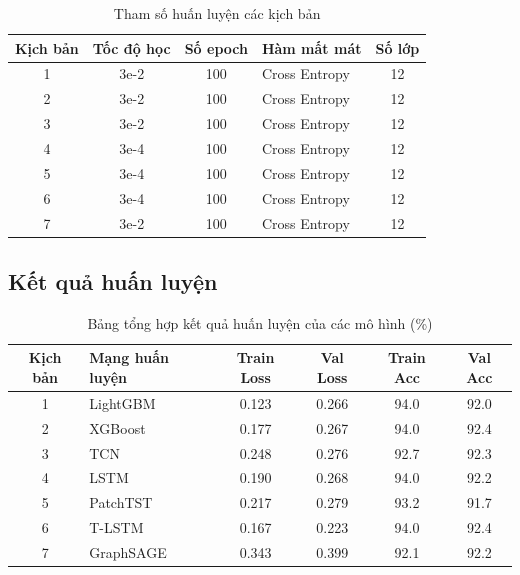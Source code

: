 \documentclass[10pt,twoside]{article}
\begin{document}
\begin{table}[H] 
\centering 
\caption{Tham số huấn luyện các kịch bản} 
\label{tab:hyperparameter} 
\begin{tabular}{c c c l c} 
\hline 
\textbf{Kịch bản} & \textbf{Tốc độ học} & \textbf{Số epoch} & \textbf{Hàm mất mát} & \textbf{Số lớp} \\ 
\hline 
1 & 3e-2 & 100 & Cross Entropy & 12 \\ 
2 & 3e-2 & 100 & Cross Entropy & 12 \\ 
3 & 3e-2 & 100 & Cross Entropy & 12 \\ 
4 & 3e-4 & 100 & Cross Entropy & 12 \\ 
5 & 3e-4 & 100 & Cross Entropy & 12 \\ 
6 & 3e-4 & 100 & Cross Entropy & 12 \\ 
7 & 3e-2 & 100 & Cross Entropy & 12 \\ 
\hline 
\end{tabular} 
\end{table}
\subsection{Kết quả huấn luyện}

\begin{table}[H]
\centering
\caption{Bảng tổng hợp kết quả huấn luyện của các mô hình (\%)}
\label{tab:training_results}
\begin{tabular}{c l c c c c}
\hline
\textbf{Kịch bản} & \textbf{Mạng huấn luyện} & \textbf{Train Loss} & \textbf{Val Loss} & \textbf{Train Acc} & \textbf{Val Acc} \\
\hline
1 & LightGBM  & 0.123 & 0.266 & 94.0 & 92.0 \\
2 & XGBoost   & 0.177 & 0.267 & 94.0 & 92.4 \\
3 & TCN       & 0.248 & 0.276 & 92.7 & 92.3 \\
4 & LSTM      & 0.190 & 0.268 & 94.0 & 92.2 \\
5 & PatchTST  & 0.217 & 0.279 & 93.2 & 91.7 \\
6 & T-LSTM    & 0.167 & 0.223 & 94.0 & 92.4 \\
7 & GraphSAGE & 0.343 & 0.399 & 92.1 & 92.2 \\
\hline
\end{tabular}
\end{table}
\end{document}
